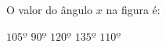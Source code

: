 O valor do \^angulo $x$ na figura \'e:

\parbox{0.27\linewidth}{

$105º$
$90º$
$120º$
$135º$
$110º$

}\parbox{0.72\linewidth}{
\begin{center}
\vspace{-3mm}
\vspace{-9mm}
\end{center}
}


